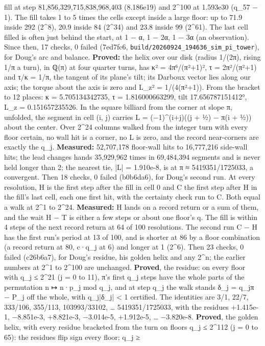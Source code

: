 \begin{description}
fill at step 81,856,329,715,838,968,403 (8.186e19) and 2\textasciicircum{}100 at 1.593e30 (q\_\allowbreak{}57 − 1). The fill takes 1 to 5 times the cells except inside a large floor: up to 71.9 inside 292 (2\textasciicircum{}8), 20.9 inside 84 (2\textasciicircum{}34) and 23.8 inside 99 (2\textasciicircum{}61). The last cell filled is often just behind the start, at 1 − α, 1 − 2α, 1 − 3α (an observation). Since then, 17 checks, 0 failed (7ed7fc6, \texttt{build/\allowbreak{}20260924\_\allowbreak{}194636\_\allowbreak{}sim\_\allowbreak{}pi\_\allowbreak{}tower}), for Doug's arc and balance. \textbf{Proved:} the helix over our disk (radius 1/(2π), rising 1/π a turn), in ℚ(π) at four quarter turns, has κ² = 4π⁶/(π²+1)², τ = 2π²/(π²+1) and τ/κ = 1/π, the tangent of its plane's tilt; its Darboux vector lies along our axis; the torque about the axis is zero and L\_\allowbreak{}z² = 1/(4(π²+1)). From the bracket to 12 places: κ = 5.705134342735, τ = 1.816000663299, tilt 17.656787151412°, L\_\allowbreak{}z = 0.151657235526. In the square billiard from the corner at slope π, unfolded, the segment in cell (i, j) carries L = (−1)\textasciicircum{}(i+j)((j + ½) − π(i + ½)) about the center. Over 2\textasciicircum{}24 columns walked from the integer turn with every floor certain, no wall hit is a corner, no L is zero, and the record near-corners are exactly the q\_\allowbreak{}j. \textbf{Measured:} 52,707,178 floor-wall hits to 16,777,216 side-wall hits; the lead changes hands 35,929,962 times in 69,484,394 segments and is never held longer than 2; the nearest tie, |L| = 1.910e-8, is at π ≈ 5419351/1725033, a convergent. Then 18 checks, 0 failed (b0b6da6), for Doug's second run. At every resolution, H is the first step after the fill in cell 0 and C the first step after H in the fill's last cell, each one first hit, with the certainty check run to C. Both equal a walk at 2\textasciicircum{}1 to 2\textasciicircum{}24. \textbf{Measured:} H lands on a record return or a sum of them, and the wait H − T is either a few steps or about one floor's q. The fill is within 4 steps of the next record return at 64 of 100 resolutions. The second run C − H has the first run's period at 13 of 100, and is shorter at 86 by a floor combination (a record return at 80, c·q\_\allowbreak{}j at 6) and longer at 1 (2\textasciicircum{}6). Then 23 checks, 0 failed (c26b6a7), for Doug's residue, his golden helix and any 2\textasciicircum{}n; the earlier numbers at 2\textasciicircum{}1 to 2\textasciicircum{}100 are unchanged. \textbf{Proved}, the residue: on every floor with q\_\allowbreak{}j ≤ 2\textasciicircum{}21 (j = 0 to 11), π's first q\_\allowbreak{}j steps have the whole parts of the permutation n ↦ n·p\_\allowbreak{}j mod q\_\allowbreak{}j, and at step q\_\allowbreak{}j the walk stands δ\_\allowbreak{}j = q\_\allowbreak{}jπ − P\_\allowbreak{}j off the whole, with q\_\allowbreak{}j|δ\_\allowbreak{}j| < 1 certified. The identities are 3/1, 22/7, 333/106, 355/113, 103993/33102, … 5419351/1725033, with the residues +1.415e-1, −8.851e-3, +8.821e-3, −3.014e-5, +1.912e-5, … −3.820e-8. \textbf{Proved}, the golden helix, with every residue bracketed from the turn on floors q\_\allowbreak{}j ≤ 2\textasciicircum{}112 (j = 0 to 65): the residues flip sign every floor; q\_\allowbreak{}j ≥ 
\end{description}

